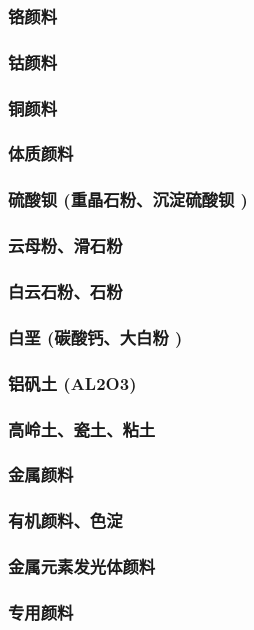 \documentclass[UTF8]{../../ApplicationUniverse}
\begin{document}
        \subsubsection{铬颜料}
        \subsubsection{钴颜料}
        \subsubsection{铜颜料}
\subsubsection{体质颜料}
    \subsubsection{硫酸钡 (重晶石粉、沉淀硫酸钡 )}
    \subsubsection{云母粉、滑石粉}
    \subsubsection{白云石粉、石粉}
    \subsubsection{白垩 (碳酸钙、大白粉 )}
    \subsubsection{铝矾土 (AL2O3)}
    \subsubsection{高岭土、瓷土、粘土}
\subsubsection{金属颜料}
\subsubsection{有机颜料、色淀}
\subsubsection{金属元素发光体颜料}
\subsubsection{专用颜料}
\end{document}
